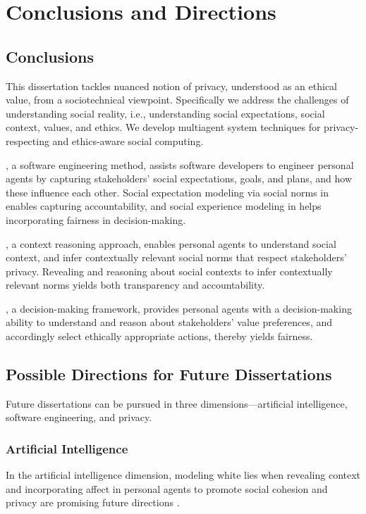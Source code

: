 \chapter{Conclusions and Directions}
\label{chap:conclusions}

\section{Conclusions}

This dissertation tackles nuanced notion of privacy, understood as an ethical value, from a sociotechnical viewpoint. 
Specifically we address the challenges of understanding social reality, i.e., understanding social expectations, social context, values, and ethics.
We develop multiagent system techniques for privacy-respecting and ethics-aware social computing.  

\frameworkA, a software engineering method, assists software developers to engineer personal agents by capturing stakeholders' social expectations, goals, and plans, and how these influence each other.  
Social expectation modeling via social norms in \frameworkA enables capturing accountability,
and social experience modeling in \frameworkA helps incorporating fairness in decision-making.

\frameworkB, a context reasoning approach, enables personal agents to understand social context, and infer contextually relevant social norms that respect stakeholders' privacy. 
Revealing and reasoning about social contexts to infer contextually relevant norms yields both transparency and accountability.

\frameworkAinur, a decision-making framework, provides personal agents with a decision-making ability to understand and reason about stakeholders' value preferences, 
and accordingly select ethically appropriate actions, thereby yields fairness.  

\section{Possible Directions for Future Dissertations}
Future dissertations can be pursued in three dimensions---artificial intelligence, software engineering, and privacy.

\subsection{Artificial Intelligence}
In the artificial intelligence dimension, modeling white lies when revealing context and incorporating affect in personal agents to promote social cohesion and privacy are promising future directions \citep{IJCAI-18:Poros,Kalia+14:Emotions}.

